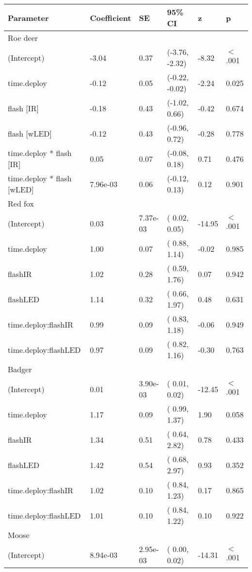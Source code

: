 \begin{table}[ht]
\centering
\begin{tabular}{llllll}
  \hline
Parameter & Coefficient & SE & 95\% CI & z & p \\ 
  \hline
Roe deer &  &  &  &  &        \\ 
  (Intercept) & -3.04 & 0.37 & (-3.76, -2.32) & -8.32 & $<$ .001 \\ 
  time.deploy & -0.12 & 0.05 & (-0.22, -0.02) & -2.24 & 0.025  \\ 
  flash [IR] & -0.18 & 0.43 & (-1.02,  0.66) & -0.42 & 0.674  \\ 
  flash [wLED] & -0.12 & 0.43 & (-0.96,  0.72) & -0.28 & 0.778  \\ 
  time.deploy * flash [IR] & 0.05 & 0.07 & (-0.08,  0.18) & 0.71 & 0.476  \\ 
  time.deploy * flash [wLED] & 7.96e-03 & 0.06 & (-0.12,  0.13) & 0.12 & 0.901  \\ 
  Red fox &  &  &  &  &        \\ 
  (Intercept) & 0.03 & 7.37e-03 & ( 0.02,  0.05) & -14.95 & $<$ .001 \\ 
  time.deploy & 1.00 & 0.07 & ( 0.88,  1.14) & -0.02 & 0.985  \\ 
  flashIR & 1.02 & 0.28 & ( 0.59,  1.76) & 0.07 & 0.942  \\ 
  flashLED & 1.14 & 0.32 & ( 0.66,  1.97) & 0.48 & 0.631  \\ 
  time.deploy:flashIR & 0.99 & 0.09 & ( 0.83,  1.18) & -0.06 & 0.949  \\ 
  time.deploy:flashLED & 0.97 & 0.09 & ( 0.82,  1.16) & -0.30 & 0.763  \\ 
  Badger &  &  &  &  &        \\ 
  (Intercept) & 0.01 & 3.90e-03 & ( 0.01,  0.02) & -12.45 & $<$ .001 \\ 
  time.deploy & 1.17 & 0.09 & ( 0.99,  1.37) & 1.90 & 0.058  \\ 
  flashIR & 1.34 & 0.51 & ( 0.64,  2.82) & 0.78 & 0.433  \\ 
  flashLED & 1.42 & 0.54 & ( 0.68,  2.97) & 0.93 & 0.352  \\ 
  time.deploy:flashIR & 1.02 & 0.10 & ( 0.84,  1.23) & 0.17 & 0.865  \\ 
  time.deploy:flashLED & 1.01 & 0.10 & ( 0.84,  1.22) & 0.10 & 0.922  \\ 
  Moose &  &  &  &  &        \\ 
  (Intercept) & 8.94e-03 & 2.95e-03 & ( 0.00,  0.02) & -14.31 & $<$ .001 \\ 

\end{tabular}
\end{table}
